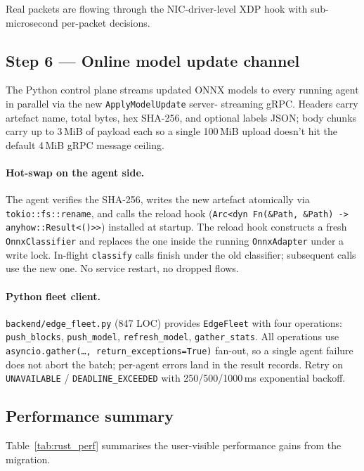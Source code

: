 \documentclass[11pt,a4paper]{article}
\begin{document}
Real packets are flowing through the NIC-driver-level XDP hook with
sub-microsecond per-packet decisions.

\subsection{Step 6 --- Online model update channel}

The Python control plane streams updated ONNX models to every running
agent in parallel via the new \texttt{ApplyModelUpdate} server-
streaming gRPC.  Headers carry artefact name, total bytes, hex
SHA-256, and optional labels JSON; body chunks carry up to 3\,MiB of
payload each so a single 100\,MiB upload doesn't hit the default
4\,MiB gRPC message ceiling.

\paragraph{Hot-swap on the agent side.}
The agent verifies the SHA-256, writes the new artefact atomically
via \texttt{tokio::fs::rename}, and calls the reload hook
(\texttt{Arc<dyn Fn(\&Path, \&Path) -> anyhow::Result<()>>}) installed
at startup.  The reload hook constructs a fresh
\texttt{OnnxClassifier} and replaces the one inside the running
\texttt{OnnxAdapter} under a write lock.  In-flight \texttt{classify}
calls finish under the old classifier; subsequent calls use the new
one.  No service restart, no dropped flows.

\paragraph{Python fleet client.}
\texttt{backend/edge\_fleet.py} (847 LOC) provides \texttt{EdgeFleet}
with four operations: \texttt{push\_blocks}, \texttt{push\_model},
\texttt{refresh\_model}, \texttt{gather\_stats}.  All operations use
\texttt{asyncio.gather(\ldots, return\_exceptions=True)} fan-out, so a
single agent failure does not abort the batch; per-agent errors land
in the result records.  Retry on \texttt{UNAVAILABLE} /
\texttt{DEADLINE\_EXCEEDED} with 250/500/1000\,ms exponential backoff.

\subsection{Performance summary}

Table~\ref{tab:rust_perf} summarises the user-visible performance
gains from the migration.
\end{document}
